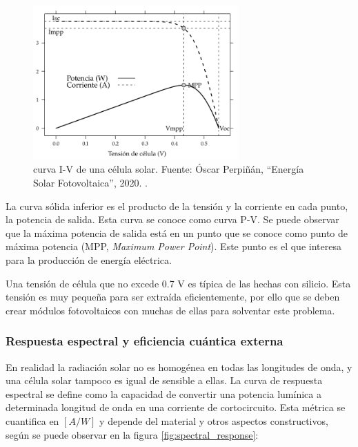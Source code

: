 \begin{figure}[H]
      \centering
      \includegraphics[width=0.7\textwidth]{./images/SoA_irrad/Solar_Cell_I-V_Curve_Schematic.png}
      \caption{\Gls{curva I-V} de una \gls{célula solar}. Fuente: Óscar Perpiñán, ``Energía Solar Fotovoltaica'', 2020. \cite[Fig. 4.6]{Perpinan2020}.}
      \label{fig:iv_curve}
\end{figure}

La curva sólida inferior es el producto de la tensión y la corriente en cada punto, la potencia de salida. Esta curva se conoce como \gls{curva P-V}. Se puede observar que la máxima potencia de salida está en un punto que se conoce como punto de máxima potencia (MPP, \textit{Maximum Power Point}). Este punto es el que interesa para la producción de energía eléctrica.

Una tensión de célula que no excede 0.7 V es típica de las hechas con silicio. Esta tensión es muy pequeña para ser extraída eficientemente, por ello que se deben crear módulos fotovoltaicos con muchas de ellas para solventar este problema.

\subsubsection{Respuesta espectral y eficiencia cuántica externa}

En realidad la \gls{radiación solar} no es homogénea en todas las longitudes de onda, y una \gls{célula solar} tampoco es igual de sensible a ellas. La curva de \gls{respuesta espectral} se define como la capacidad de convertir una potencia lumínica a determinada \gls{longitud de onda} en una corriente de cortocircuito. Esta métrica se cuantifica en $[A/W]$ y depende del material y otros aspectos constructivos, según se puede observar en la figura \ref{fig:spectral_response}:

